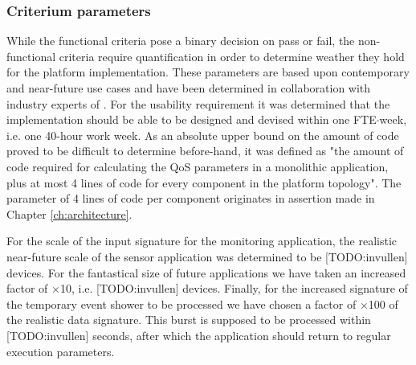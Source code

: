 \subsubsection{Criterium parameters}
While the functional criteria pose a binary decision on pass or fail, the non-functional criteria require quantification in order to determine weather they hold for the platform implementation. These parameters are based upon contemporary and near-future use cases and have been determined in collaboration with industry experts of \nedap. For the usability requirement it was determined that the implementation should be able to be designed and devised within one FTE$\cdot$week, i.e. one 40-hour work week. As an absolute upper bound on the amount of code proved to be difficult to determine before-hand, it was defined as "the amount of code required for calculating the QoS parameters in a monolithic application, plus at most 4 lines of code for every component in the platform topology". The parameter of 4 lines of code per component originates in assertion made in Chapter \ref{ch:architecture}.

For the scale of the input signature for the monitoring application, the realistic near-future scale of the sensor application was determined to be [TODO:invullen] devices. For the fantastical size of future applications we have taken an increased factor of $\times$10, i.e. [TODO:invullen] devices. Finally, for the increased signature of the temporary event shower to be processed we have chosen a factor of $\times$100 of the realistic data signature. This burst is supposed to be processed within [TODO:invullen] seconds, after which the application should return to regular execution parameters.

